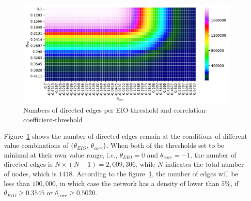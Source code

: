 
\begin{figure}
	\begin{center}
		\includegraphics[width=15cm]{amounts_of_edges_threshold}
	\end{center}
	\caption{Numbers of directed edges per EIO-threshold and correlation-coefficient-threshold}
	\label{fig:amounts_of_edges_threshold}  
\end{figure}

Figure~\ref{fig:amounts_of_edges_threshold} shows the number of directed edges remain at the conditions of different value combinations of $\{\theta_{EIO}$, $\theta_{corr}\}$. When both of the thresholds set to be minimal at their own value range, i.e., $\theta_{EIO}=0$ and $\theta_{corr}=-1$, the number of directed edges is $N\times(N-1)=2,009,306$, while $N$ indicates the total number of nodes, which is $1418$. According to the figure~\ref{fig:amounts_of_edges_threshold}, the number of edges will be less than $100,000$, in which case the network has a density of lower than $5\%$, if $\theta_{EIO}\geq0.3545$ or $\theta_{corr}\geq0.5020$. 

